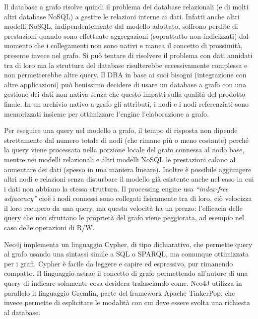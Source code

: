 \documentclass[a4page, 11pt]{article}
\begin{document}
Il database a grafo risolve quindi il problema dei database relazionali (e di molti altri database NoSQL) a gestire le relazioni interne ai dati.
Infatti anche altri modelli NoSQL, indipendentemente dal modello adottato, soffrono perdite di prestazioni quando sono effettuate aggregazioni (soprattutto non indicizzati) dal momento che i collegamenti non sono nativi e manca il concetto di prossimità, presente invece nel grafo.
Si può tentare di risolvere il problema con dati annidati tra di loro ma la struttura del database risulterebbe eccessivamente complessa e non permetterebbe altre query.
Il DBA in base ai suoi bisogni (integrazione con altre applicazioni) può benissimo decidere di usare un database a grafo con una gestione dei dati non nativa senza che questo impatti sulla qualità del prodotto finale.
In un archivio nativo a grafo gli attributi, i nodi e i nodi referenziati sono memorizzati insieme per ottimizzare l'engine l'elaborazione a grafo.

Per eseguire una query nel modello a grafo, il tempo di risposta non dipende strettamente dal numero totale di nodi (che rimane più o meno costante) perché la query viene processata nella porzione locale del grafo connessa al nodo base, mentre nei modelli relazionali e altri modelli NoSQL le prestazioni calano al aumentare dei dati (spesso in una maniera lineare).
Inoltre è possibile aggiungere altri nodi e relazioni senza disturbare il modello già esistente anche nel caso in cui i dati non abbiano la stessa struttura.
Il processing engine usa \textit{``index-free adjacency''} cioè i nodi connessi sono collegati fisicamente tra di loro, ciò velocizza il loro recupero da una query, ma questa velocità ha un prezzo: l'efficacia delle query che non sfruttano le proprietà del grafo viene peggiorata, ad esempio nel caso delle operazioni di R/W.

Neo4j implementa un linguaggio Cypher, di tipo dichiarativo, che permette query al grafo usando una sintassi simile a SQL o SPARQL, ma comunque ottimizzata per i grafi.
Cypher è facile da leggere e capire ed espressivo, pur rimanendo compatto.
Il linguaggio astrae il concetto di grafo permettendo all'autore di una query di indicare solamente cosa desidera tralasciando come. \newline
Neo4J utilizza in parallelo il linguaggio Gremlin, parte del framework Apache TinkerPop, che invece permette di esplicitare le modalità con cui deve essere svolta una richiesta al database.
\end{document}

